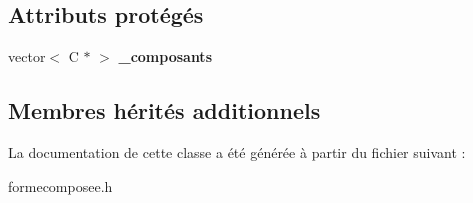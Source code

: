 \subsection*{Attributs protégés}
\begin{DoxyCompactItemize}
\item 
\hypertarget{class_forme_composee_a5d6afdf045e0fcec2071520004aacc40}{vector$<$ C $\ast$ $>$ {\bfseries \+\_\+composants}}\label{class_forme_composee_a5d6afdf045e0fcec2071520004aacc40}

\end{DoxyCompactItemize}
\subsection*{Membres hérités additionnels}


La documentation de cette classe a été générée à partir du fichier suivant \+:\begin{DoxyCompactItemize}
\item 
formecomposee.\+h\end{DoxyCompactItemize}
